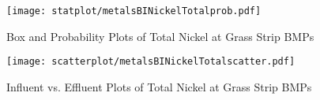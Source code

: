        \begin{figure}[hb]   %
            \centering
            \texttt{[image: statplot/metalsBINickelTotalprob.pdf]}
            \caption{Box and Probability Plots of Total Nickel at Grass Strip BMPs}
        \end{figure}         %
        
        
        \begin{figure}[hb]   %
            \centering
            \texttt{[image: scatterplot/metalsBINickelTotalscatter.pdf]}
            \caption{Influent vs. Effluent Plots of Total Nickel at Grass Strip BMPs}
        \end{figure}         %
        \clearpage
        